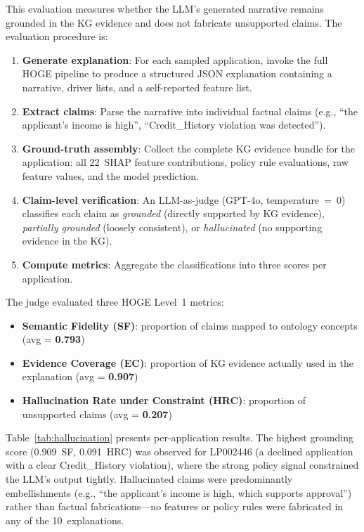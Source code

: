 \documentclass[lnbip]{svmultln}
\begin{document}
This evaluation measures whether the LLM's generated narrative remains grounded in the KG evidence and does not fabricate unsupported claims. The evaluation procedure is:

\begin{enumerate}
    \item \textbf{Generate explanation}: For each sampled application, invoke the full HOGE pipeline to produce a structured JSON explanation containing a narrative, driver lists, and a self-reported feature list.
    \item \textbf{Extract claims}: Parse the narrative into individual factual claims (e.g., ``the applicant's income is high'', ``Credit\_History violation was detected'').
    \item \textbf{Ground-truth assembly}: Collect the complete KG evidence bundle for the application: all 22~SHAP feature contributions, policy rule evaluations, raw feature values, and the model prediction.
    \item \textbf{Claim-level verification}: An LLM-as-judge (GPT-4o, temperature~=~0) classifies each claim as \emph{grounded} (directly supported by KG evidence), \emph{partially grounded} (loosely consistent), or \emph{hallucinated} (no supporting evidence in the KG).
    \item \textbf{Compute metrics}: Aggregate the classifications into three scores per application.
\end{enumerate}

The judge evaluated three HOGE Level~1 metrics:

\begin{itemize}
    \item \textbf{Semantic Fidelity (SF)}: proportion of claims mapped to ontology concepts (avg = \textbf{0.793})
    \item \textbf{Evidence Coverage (EC)}: proportion of KG evidence actually used in the explanation (avg = \textbf{0.907})
    \item \textbf{Hallucination Rate under Constraint (HRC)}: proportion of unsupported claims (avg = \textbf{0.207})
\end{itemize}

Table~\ref{tab:hallucination} presents per-application results. The highest grounding score (0.909~SF, 0.091~HRC) was observed for LP002446 (a declined application with a clear Credit\_History violation), where the strong policy signal constrained the LLM's output tightly. Hallucinated claims were predominantly embellishments (e.g., ``the applicant's income is high, which supports approval'') rather than factual fabrications---no features or policy rules were fabricated in any of the 10~explanations.
\end{document}
